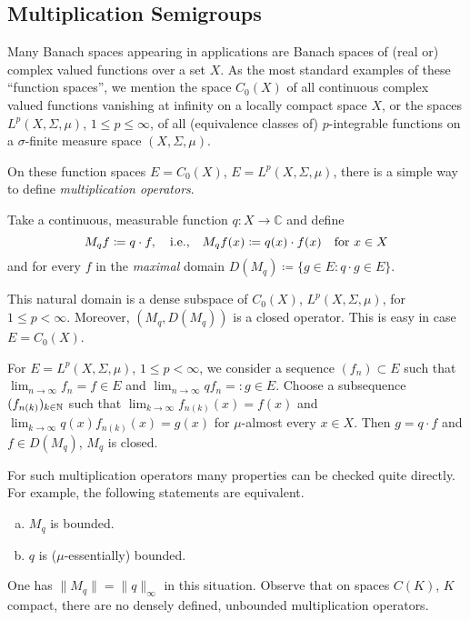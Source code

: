 \subsection{Multiplication Semigroups}\label{subsec:a1-2.3}
Many Banach spaces appearing in applications are Banach spaces of (real or) complex valued functions over a set $X$.
As the most standard examples of these \enquote{function spaces}, we mention the space $C_{0}(X)$ of all continuous complex valued functions vanishing at infinity on a locally compact space $X$, or the spaces $L^{p}(X,\Sigma,\mu)$, $1 \leq p \leq \infty$, of all (equivalence classes of) $p$-integrable functions on a $\sigma$-finite measure space $(X,\Sigma,\mu)$.

On these function spaces $E = C_{0}(X)$, \resp $E = L^{p}(X,\Sigma,\mu)$, there is a simple way to define \emph{multiplication operators}.

Take a continuous, \resp measurable function $q \colon X \to \mathbb{C}$ and define
\[
    M_{q}f \coloneqq q \cdot f, \quad \text{i.e.,} \quad M_{q}f(x) 
    \coloneqq q(x) 	\cdot f(x) \quad \text{for } x \in X 
\]
and for every $f$ in the \emph{maximal} domain $D(M_{q}) \coloneqq \{g \in E \colon q \cdot g \in E\}$.

This natural domain is a dense subspace of $C_{0}(X)$, \resp $L^{p}(X,\Sigma,\mu)$, for $1 \leq p < \infty$.
Moreover, $(M_{q},D(M_{q}))$ is a closed operator.
This is easy in case $E = C_{0}(X)$.

For $E = L^{p}(X,\Sigma,\mu)$, $1 \leq p < \infty$, we consider a sequence $(f_{n}) \subset E$ such that $\lim_{n \to \infty} f_{n} = f \in E$ and $\lim_{n \to \infty} qf_{n} = \colon g \in E$.
Choose a subsequence $(f_{n(k)})_{k \in \mathbb{N}}$ such that $\lim_{k \to \infty} f_{n(k)}(x) = f(x)$ and $\lim_{k \to \infty} q(x)f_{n(k)}(x) = g(x)$ for $\mu$-almost every $x \in X$.
Then $g = q \cdot f$ and $f \in D(M_{q})$, \ie $M_{q}$ is closed.

For such multiplication operators many properties can be checked quite directly.
For example, the following statements are equivalent.
\begin{enumerate}[(a)]
\item 
$M_{q}$ is bounded.

\item 
$q$ is ($\mu$-essentially) bounded.
\end{enumerate}
One has $\|M_{q}\| = \|q\|_{\infty}$ in this situation.
Observe that on spaces $C(K)$, $K$ compact, there are no densely defined, unbounded multiplication operators.

